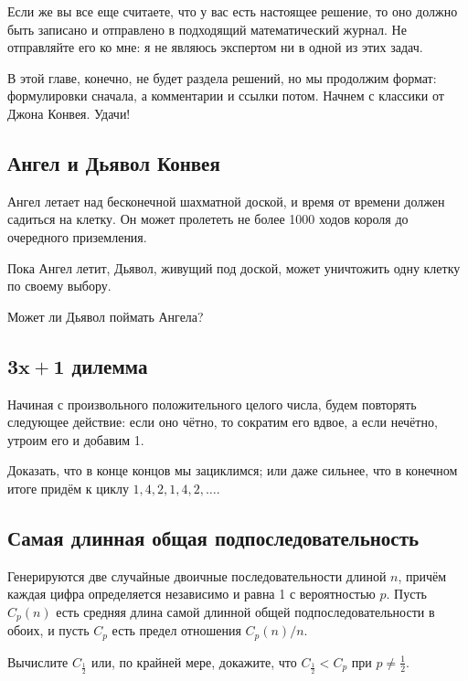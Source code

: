 Если же вы все еще считаете, что у вас есть настоящее решение, то оно должно быть записано и отправлено в подходящий математический журнал.
Не отправляйте его ко мне: я не являюсь экспертом ни в одной из этих задач.

\medskip

В этой главе, конечно, не будет раздела решений, но мы продолжим формат: формулировки сначала, а комментарии и ссылки потом.
Начнем с классики от Джона Конвея.
Удачи!


\subsection*{Ангел и Дьявол Конвея}

Ангел летает над бесконечной шахматной доской, и время от времени должен садиться на клетку.
Он может пролететь не более 1000 ходов короля до очередного приземления.

Пока Ангел летит, Дьявол, живущий под доской, может уничтожить одну клетку по своему выбору.

Может ли Дьявол поймать Ангела?

\subsection*{$\bm{3x+1}$ дилемма}

Начиная с произвольного положительного целого числа, будем повторять следующее действие: если оно чётно, то сократим его вдвое, а если нечётно, утроим его и добавим 1.

Доказать, что в конце концов мы зациклимся; или даже сильнее, что в конечном итоге придём к циклу $1, 4, 2, 1, 4, 2,\dots$.

\subsection*{Самая длинная общая подпоследовательность}

Генерируются две случайные двоичные последовательности длиной $n$, причём каждая цифра определяется независимо и равна 1 с вероятностью $p$.
Пусть $C_p(n)$ есть средняя длина самой длинной общей подпоследовательности в обоих, и пусть $C_p$ есть предел отношения $C_p(n)/n$.

Вычислите $C_{\frac12}$ или, по крайней мере, докажите, что $C_{\frac12}<C_{p}$ при $p\ne\tfrac12$.

